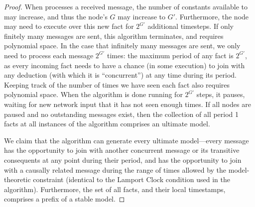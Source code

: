 \begin{proof}
When  processes a received message, the number of constants
available to  may increase, and thus the node's $G$ may increase to
$G'$.  Furthermore, the node may need to execute over this new fact for
$2^{G'}$ additional timesteps.  If only finitely many messages are sent, this
algorithm terminates, and requires polynomial space.  In the case that
infinitely many messages are sent, we only need to process each message
$2^{G'}$ times: the maximum period of any fact is $2^{G'}$, as every incoming
fact needs to have a chance (in some execution) to join with any deduction
(with which it is ``concurrent'') at any time during its period.  Keeping track
of the number of times we have seen each fact also requires polynomial space.
When the algorithm is done running for $2^{G'}$ steps, it pauses, waiting for
new network input that it has not seen enough times.  If all nodes are paused
and no outstanding messages exist, then the collection of all period 1 facts at
all instances of the algorithm comprises an ultimate model.

We claim that the algorithm can generate every ultimate model---every message has the opportunity to join with another concurrent message or its transitive consequents at any point during their period, and has the opportunity to join with a causally related message during the range of times allowed by the model-theoretic constraint (identical to the Lamport Clock condition used in the algorithm).  Furthermore, the set of all facts, and their local timestamps, comprises a prefix of a stable model.


\end{proof}

